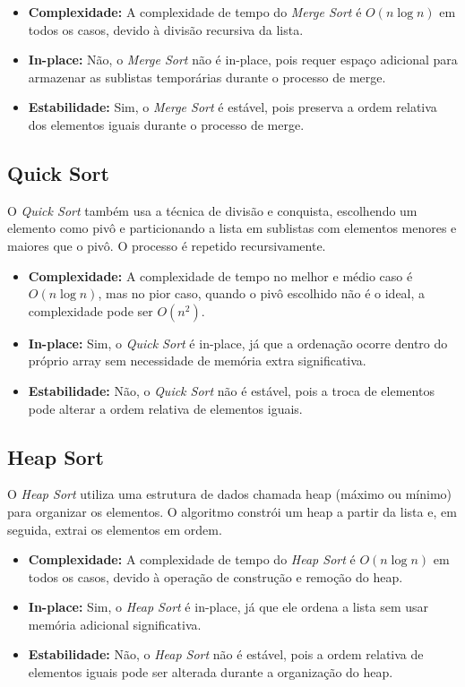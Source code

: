 \documentclass[a4paper,12pt]{article}
\begin{document}
\begin{itemize}
    \item \textbf{Complexidade:} A complexidade de tempo do \textit{Merge Sort} é $O(n \log n)$ em todos os casos, devido à divisão recursiva da lista.
    \item \textbf{In-place:} Não, o \textit{Merge Sort} não é in-place, pois requer espaço adicional para armazenar as sublistas temporárias durante o processo de merge.
    \item \textbf{Estabilidade:} Sim, o \textit{Merge Sort} é estável, pois preserva a ordem relativa dos elementos iguais durante o processo de merge.
\end{itemize}

\subsection{Quick Sort}
O \textit{Quick Sort} também usa a técnica de divisão e conquista, escolhendo um elemento como pivô e particionando a lista em sublistas com elementos menores e maiores que o pivô. O processo é repetido recursivamente.

\begin{itemize}
    \item \textbf{Complexidade:} A complexidade de tempo no melhor e médio caso é $O(n \log n)$, mas no pior caso, quando o pivô escolhido não é o ideal, a complexidade pode ser $O(n^2)$.
    \item \textbf{In-place:} Sim, o \textit{Quick Sort} é in-place, já que a ordenação ocorre dentro do próprio array sem necessidade de memória extra significativa.
    \item \textbf{Estabilidade:} Não, o \textit{Quick Sort} não é estável, pois a troca de elementos pode alterar a ordem relativa de elementos iguais.
\end{itemize}

\subsection{Heap Sort}
O \textit{Heap Sort} utiliza uma estrutura de dados chamada heap (máximo ou mínimo) para organizar os elementos. O algoritmo constrói um heap a partir da lista e, em seguida, extrai os elementos em ordem.

\begin{itemize}
    \item \textbf{Complexidade:} A complexidade de tempo do \textit{Heap Sort} é $O(n \log n)$ em todos os casos, devido à operação de construção e remoção do heap.
    \item \textbf{In-place:} Sim, o \textit{Heap Sort} é in-place, já que ele ordena a lista sem usar memória adicional significativa.
    \item \textbf{Estabilidade:} Não, o \textit{Heap Sort} não é estável, pois a ordem relativa de elementos iguais pode ser alterada durante a organização do heap.
\end{itemize}
\end{document}

